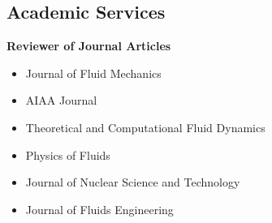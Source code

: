 \documentclass[10pt]{article}
\newenvironment{myitemize}
{ \begin{itemize}
    \setlength{\itemsep}{0pt}
    \setlength{\parskip}{0pt}
    \setlength{\parsep}{0pt}     }
{ \end{itemize}                  }
\begin{document}
\vspace{-0.1in}
\subsection*{Academic Services}
{\bf \color{Blue}Reviewer of Journal Articles}
\vspace{-0.05in}
	\begin{myitemize}
 \item Journal of Fluid Mechanics
	\item AIAA Journal
 \item Theoretical and Computational Fluid Dynamics
	\item Physics of Fluids
	\item Journal of Nuclear Science and Technology
	\item Journal of Fluids Engineering

	\end{myitemize}
\end{document}
